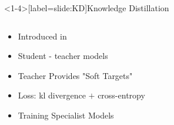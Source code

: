 \documentclass[aspectratio=169,xcolor=dvipsnames]{beamer}
\begin{document}
\begin{frame}<1-4>[label=slide:KD]{Knowledge Distillation}
    \begin{columns}
        \begin{column}{0.4\textwidth}
            \begin{itemize}
                \item<1-> Introduced in \cite{hinton_distilling_2015} %
                \item<2-> Student - teacher models 
                \item<3-> Teacher Provides "Soft Targets"
                \item<4-> Loss: kl divergence $+$ cross-entropy
                \item<5-> Training Specialist Models 
            \end{itemize}
        \end{column}


\end{columns}
\end{frame}
\end{document}
